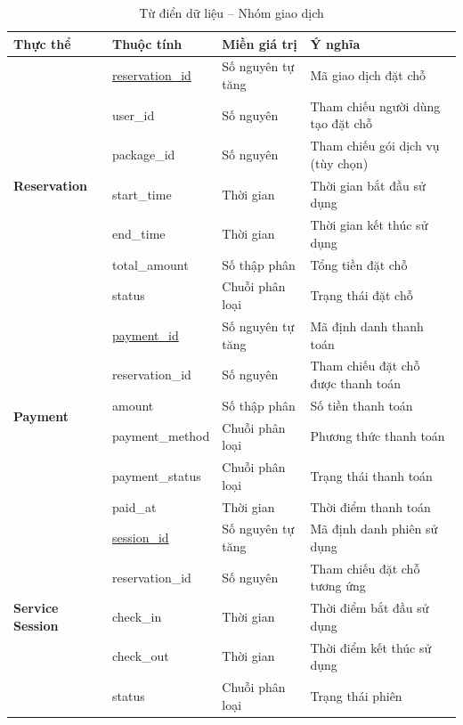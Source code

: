 \begin{table}[htbp]
    \centering
    \label{tab:data_dictionary_4}
    \renewcommand{\arraystretch}{1.3}
    \scriptsize
    \begin{tabular}{|l|l|l|p{5.5cm}|}
        \hline
        \textbf{Thực thể} & \textbf{Thuộc tính} & \textbf{Miền giá trị} & \textbf{Ý nghĩa} \\ \hline
        \multirow{7}{*}{\textbf{Reservation}}
        & \underline{reservation\_id} & Số nguyên tự tăng & Mã giao dịch đặt chỗ \\ \cline{2-4}
        & user\_id & Số nguyên & Tham chiếu người dùng tạo đặt chỗ \\ \cline{2-4}
        & package\_id & Số nguyên & Tham chiếu gói dịch vụ (tùy chọn) \\ \cline{2-4}
        & start\_time & Thời gian & Thời gian bắt đầu sử dụng \\ \cline{2-4}
        & end\_time & Thời gian & Thời gian kết thúc sử dụng \\ \cline{2-4}
        & total\_amount & Số thập phân & Tổng tiền đặt chỗ \\ \cline{2-4}
        & status & Chuỗi phân loại & Trạng thái đặt chỗ \\ \hline
        \multirow{6}{*}{\textbf{Payment}}
        & \underline{payment\_id} & Số nguyên tự tăng & Mã định danh thanh toán \\ \cline{2-4}
        & reservation\_id & Số nguyên & Tham chiếu đặt chỗ được thanh toán \\ \cline{2-4}
        & amount & Số thập phân & Số tiền thanh toán \\ \cline{2-4}
        & payment\_method & Chuỗi phân loại & Phương thức thanh toán \\ \cline{2-4}
        & payment\_status & Chuỗi phân loại & Trạng thái thanh toán \\ \cline{2-4}
        & paid\_at & Thời gian & Thời điểm thanh toán \\ \hline
        \multirow{5}{*}{\textbf{Service Session}}
        & \underline{session\_id} & Số nguyên tự tăng & Mã định danh phiên sử dụng \\ \cline{2-4}
        & reservation\_id & Số nguyên & Tham chiếu đặt chỗ tương ứng \\ \cline{2-4}
        & check\_in & Thời gian & Thời điểm bắt đầu sử dụng \\ \cline{2-4}
        & check\_out & Thời gian & Thời điểm kết thúc sử dụng \\ \cline{2-4}
        & status & Chuỗi phân loại & Trạng thái phiên \\ \hline
    \end{tabular}
    \caption{Từ điển dữ liệu -- Nhóm giao dịch}
\end{table}

